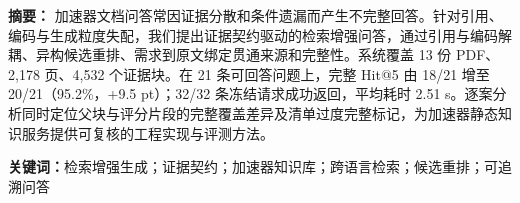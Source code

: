 \noindent\textbf{摘要：}
加速器文档问答常因证据分散和条件遗漏而产生不完整回答。针对引用、编码与生成粒度失配，我们提出证据契约驱动的检索增强问答，通过引用与编码解耦、异构候选重排、需求到原文绑定贯通来源和完整性。系统覆盖 13 份 PDF、2,178 页、4,532 个证据块。在 21 条可回答问题上，完整 Hit@5 由 18/21 增至 20/21（95.2\%，+9.5 pt）；32/32 条冻结请求成功返回，平均耗时 2.51 s。逐案分析同时定位父块与评分片段的完整覆盖差异及清单过度完整标记，为加速器静态知识服务提供可复核的工程实现与评测方法。

\smallskip
\noindent\textbf{关键词：}检索增强生成；证据契约；加速器知识库；跨语言检索；候选重排；可追溯问答
